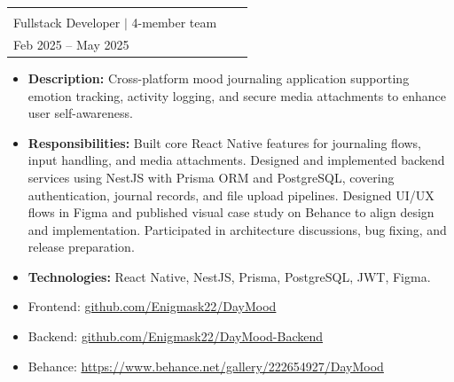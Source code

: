 \documentclass[a4paper,12pt]{article}
\makeatletter
\newenvironment{joblong}[2]
    {
    \begin{tabularx}{\linewidth}{@{}l X r@{}}
    \textbf{#1} & \hfill &  #2 \\[3.75pt]
    \end{tabularx}
    \begin{minipage}[t]{\linewidth}
    \begin{itemize}[nosep,after=\strut, leftmargin=1em, itemsep=3pt,label=--]
    }
    {
    \end{itemize}
    \end{minipage}    
    }
\makeatother
\begin{document}

\begin{joblong}{{\shortstack[l]{Day Mood - Mood Journaling App\\ Fullstack Developer $|$ 4-member team}}}{{\shortstack[r]{Mobile Application Development\\ Feb 2025 -- May 2025}}}
\item \textbf{Description:} Cross-platform mood journaling application supporting emotion tracking, activity logging, and secure media attachments to enhance user self-awareness.
\item \textbf{Responsibilities:} Built core React Native features for journaling flows, input handling, and media attachments. Designed and implemented backend services using NestJS with Prisma ORM and PostgreSQL, covering authentication, journal records, and file upload pipelines. Designed UI/UX flows in Figma and published visual case study on Behance to align design and implementation. Participated in architecture discussions, bug fixing, and release preparation.
\item \textbf{Technologies:} React Native, NestJS, Prisma, PostgreSQL, JWT, Figma.
\item Frontend: \href{https://github.com/Enigmask22/DayMood}{github.com/Enigmask22/DayMood}
\item Backend: \href{https://github.com/Enigmask22/DayMood-Backend}{github.com/Enigmask22/DayMood-Backend}
\item Behance: \href{https://www.behance.net/gallery/222654927/DayMood}{https://www.behance.net/gallery/222654927/DayMood}
\end{joblong}
\end{document}

